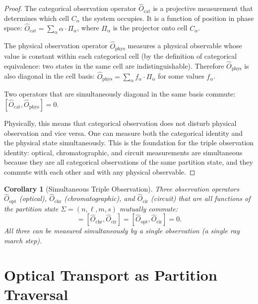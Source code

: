 \documentclass[11pt,twocolumn,a4paper]{article}
\newtheorem{corollary}[theorem]{Corollary}
\newcommand{\Ocat}{\hat{O}_{\mathrm{cat}}}
\newcommand{\Ophys}{\hat{O}_{\mathrm{phys}}}
\begin{document}
\begin{proof}
The categorical observation operator $\Ocat$ is a projective
measurement that determines which cell $C_\alpha$ the system
occupies. It is a function of position in phase space:
$\Ocat = \sum_\alpha \alpha \cdot \Pi_\alpha$, where $\Pi_\alpha$ is
the projector onto cell $C_\alpha$.

The physical observation operator $\Ophys$ measures a physical
observable whose value is constant within each categorical cell (by
the definition of categorical equivalence: two states in the same cell
are indistinguishable). Therefore $\Ophys$ is also diagonal in the
cell basis: $\Ophys = \sum_\alpha f_\alpha \cdot \Pi_\alpha$ for some
values $f_\alpha$.

Two operators that are simultaneously diagonal in the same basis
commute: $[\Ocat, \Ophys] = 0$.

Physically, this means that categorical observation does not disturb
physical observation and vice versa. One can measure both the
categorical identity and the physical state simultaneously. This is
the foundation for the triple observation identity: optical, chromatographic,
and circuit measurements are simultaneous because they are all
categorical observations of the same partition state, and they commute
with each other and with any physical observable.
\end{proof}

\begin{corollary}[Simultaneous Triple Observation]
\label{cor:simultaneous}
Three observation operators $\hat{O}_{\mathrm{opt}}$ (optical),
$\hat{O}_{\mathrm{chr}}$ (chromatographic), and
$\hat{O}_{\mathrm{cir}}$ (circuit) that are all functions of the
partition state $\Sigma = (n,\ell,m,s)$ mutually commute:
\begin{equation}
[\hat{O}_{\mathrm{opt}}, \hat{O}_{\mathrm{chr}}] =
[\hat{O}_{\mathrm{chr}}, \hat{O}_{\mathrm{cir}}] =
[\hat{O}_{\mathrm{opt}}, \hat{O}_{\mathrm{cir}}] = 0.
\end{equation}
All three can be measured simultaneously by a single observation
(a single ray march step).
\end{corollary}



\section{Optical Transport as Partition Traversal}
\label{sec:optical-transport}
\end{document}
